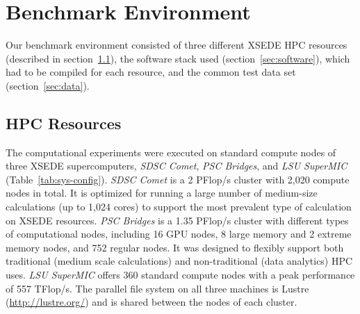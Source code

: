 
\section{Benchmark Environment}
\label{sec:system}
Our benchmark environment consisted of three different XSEDE \cite{xsede} HPC resources (described in section~\ref{sec:hpcresources}), the software stack used (section~\ref{sec:software}), which had to be compiled for each resource, and the common test data set (section~\ref{sec:data}).

\subsection{HPC Resources}
\label{sec:hpcresources}

The computational experiments were executed on standard compute nodes of three XSEDE \cite{xsede} supercomputers, \emph{SDSC Comet}, \emph{PSC Bridges}, and \emph{LSU SuperMIC} (Table~\ref{tab:sys-config}).
\emph{SDSC Comet} is a 2 PFlop/s cluster with 2,020 compute nodes in total. It is optimized for running a large number of medium-size calculations (up to 1,024 cores) to support the most prevalent type of calculation on XSEDE resources.
\emph{PSC Bridges} is a 1.35 PFlop/s cluster with different types of computational nodes, including 16 GPU nodes, 8 large memory and 2 extreme memory nodes, and 752 regular nodes.
It was designed to flexibly support both traditional (medium scale calculations) and non-traditional (data analytics) HPC uses.
\emph{LSU SuperMIC} offers 360 standard compute nodes with a peak performance of 557 TFlop/s.
The parallel file system on all three machines is Lustre (\url{http://lustre.org/}) and is shared between the nodes of each cluster.

